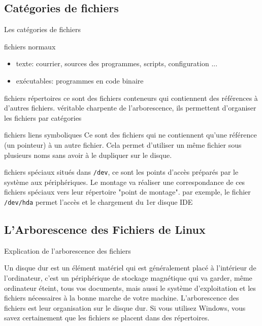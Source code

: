 \documentclass[10pt]{beamer}
\begin{document}
\subsection{Catégories de fichiers}
\begin{frame}{Les catégories de fichiers}
\begin{alertblock}{fichiers normaux}
\begin{itemize}
\item texte: courrier, sources des programmes, scripts, configuration ...
\item exécutables: programmes en code binaire
\end{itemize}
\end{alertblock}

\begin{alertblock}{fichiers répertoires}
ce sont des fichiers conteneurs qui contiennent des références à d'autres fichiers.
véritable charpente de l'arborescence, ils permettent d'organiser les fichiers par
catégories
\end{alertblock}

\begin{alertblock}{fichiers liens symboliques}
Ce sont des fichiers qui ne contiennent qu'une référence (un pointeur) à un autre fichier.
Cela permet d'utiliser un même fichier sous plusieurs noms sans avoir à le dupliquer sur le disque.
\end{alertblock}
\end{frame}

\begin{frame}
\begin{alertblock}{fichiers spéciaux}
situés dans \texttt{/dev}, ce sont les points d'accès préparés par le système aux
périphériques. Le montage va réaliser une correspondance de ces fichiers spéciaux
vers leur répertoire "point de montage".
par exemple, le fichier \texttt{/dev/hda} permet l'accès et le chargement du 1er disque IDE
\end{alertblock}
\end{frame}

\subsection{L'Arborescence des Fichiers de Linux}
\begin{frame}{Explication de l'arborescence des fichiers}

Un disque dur est un élément matériel qui est généralement placé à l’intérieur de
l’ordinateur, c’est un périphérique de stockage magnétique qui va garder, même
ordinateur éteint, tous vos documents, mais aussi le système d’exploitation et les
fichiers nécessaires  à la bonne   marche  de  votre  machine.  L’arborescence  des
fichiers est leur organisation sur le disque dur. Si vous utilisez Windows, vous savez
certainement que les fichiers se placent dans des répertoires.
\end{frame}
\end{document}
